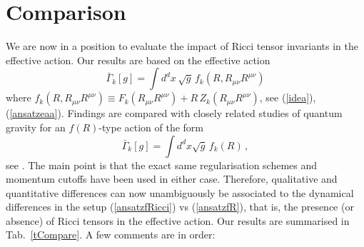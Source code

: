 \documentclass[notitlepage,eqsecnum,bm,amsmath,preprintnumbers,superscriptaddress,nofootinbib,aps,11pt]{revtex4-1}
\def\eq#1{(\ref{#1})}
\begin{document}
\section{\bf Comparison}\label{sec:discussion}
We are now in a position to evaluate the impact of Ricci tensor invariants in the effective action. Our results are based on the effective action
  \begin{equation}\label{ansatzfRicci}
\bar\Gamma_k[g]=\int d^dx\,\sqrt{g}\,f_k(R, R_{\mu\nu}R^{\mu\nu})
\end{equation}
where $f_k(R,R_{\mu\nu}R^{\mu\nu})\equiv F_k(R_{\mu\nu}R^{\mu\nu})+R\,Z_k(R_{\mu\nu}R^{\mu\nu})$, see \eq{idea}, \eq{ansatzeaa}. Findings are compared with closely related studies of quantum gravity for an $f(R)$-type action of the form
\begin{equation}\label{ansatzfR}
\bar\Gamma_k[g]=\int d^dx
\sqrt{g}\,f_k(R)\,,
\end{equation}
 see \cite{Falls:2013bv,Falls:2014tra,Falls:2016wsa}. The main point  is that the exact same regularisation schemes and momentum cutoffs have been used in either case. Therefore, qualitative and quantitative differences can now unambiguously be associated to the dynamical differences in the setup \eq{ansatzfRicci} vs \eq{ansatzfR}, that is, the presence (or absence) of Ricci tensors in the effective action. 
 Our results are summarised in Tab.~\ref{tCompare}. A few comments are in order:
\end{document}
